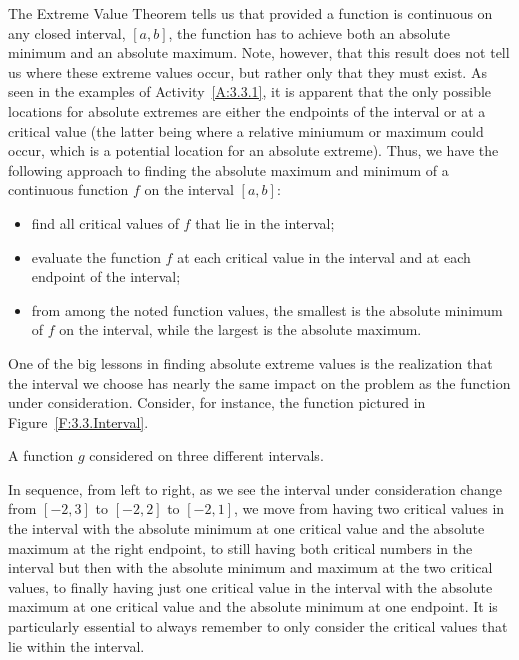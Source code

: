 The Extreme Value Theorem tells us that provided a function is continuous on any closed interval, $[a,b]$, the function has to achieve both an absolute minimum and an absolute maximum.  Note, however, that this result does not tell us where these extreme values occur, but rather only that they must exist.  As seen in the examples of Activity~\ref{A:3.3.1}, it is apparent that the only possible locations for absolute extremes are either the endpoints of the interval or at a critical value (the latter being where a relative miniumum or maximum could occur, which is a potential location for an absolute extreme).  Thus, we have the following approach to finding the absolute maximum and minimum of a continuous function $f$ on the interval $[a,b]$:
\begin{itemize}
	\item find all critical values of $f$ that lie in the interval;
	\item evaluate the function $f$ at each critical value in the interval and at each endpoint of the interval;
	\item from among the noted function values, the smallest is the absolute minimum of $f$ on the interval, while the largest is the absolute maximum.
\end{itemize}





One of the big lessons in finding absolute extreme values is the realization that the interval we choose has nearly the same impact on the problem as the function under consideration.  Consider, for instance, the function pictured in Figure~\ref{F:3.3.Interval}.

\begin{marginfigure}[1cm] %
\caption{A function $g$ considered on three different intervals.} \label{F:3.3.Interval}
\end{marginfigure}

In sequence, from left to right, as we see the interval under consideration change from $[-2,3]$ to $[-2,2]$ to $[-2,1]$, we move from having two critical values in the interval with the absolute minimum at one critical value and the absolute maximum at the right endpoint, to still having both critical numbers in the interval but then with the absolute minimum and maximum at the two critical values, to finally having just one critical value in the interval with the absolute maximum at one critical value and the absolute minimum at one endpoint.  It is particularly essential to always remember to only consider the critical values that lie within the interval.

